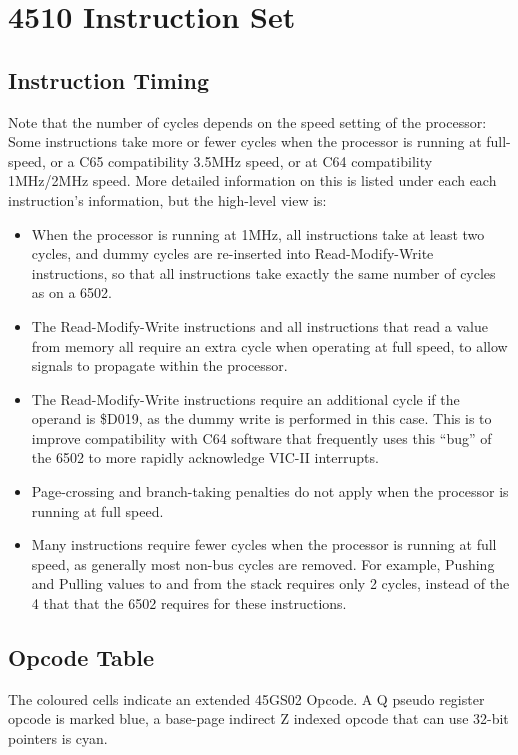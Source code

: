 \clearpage
\section{4510 Instruction Set}

\subsection{Instruction Timing}

Note that the number of cycles depends on the speed setting of the
processor: Some instructions take more or fewer cycles when the
processor is running at full-speed, or a C65 compatibility 3.5MHz speed,
or at C64 compatibility 1MHz/2MHz speed.  More detailed information on
this is listed under each each instruction's information, but the high-level
view is:

\begin{itemize}
\item When the processor is running at 1MHz, all instructions take at least
  two cycles, and dummy cycles are re-inserted into Read-Modify-Write instructions,
  so that all instructions take exactly the same number of cycles as on a 6502.
\item The Read-Modify-Write instructions and all instructions that read a value from
  memory all require an extra cycle when operating at full speed, to allow signals
  to propagate within the processor.
\item The Read-Modify-Write instructions require an additional cycle if the operand
  is \$D019, as the dummy write is performed in this case.
  This is to improve compatibility with C64 software that frequently uses this
  ``bug'' of the 6502 to more rapidly acknowledge VIC-II interrupts.
\item Page-crossing and branch-taking penalties do not apply when the processor is
  running at full speed.
\item Many instructions require fewer cycles when the processor is running at full
  speed, as generally most non-bus cycles are removed. For example, Pushing and Pulling
  values to and from the stack requires only 2 cycles, instead of the 4 that that the
  6502 requires for these instructions.
\end{itemize}

\subsection{Opcode Table}

The coloured cells indicate an extended 45GS02 Opcode. A Q pseudo register opcode is
marked blue, a base-page indirect Z indexed opcode that can use 32-bit pointers is cyan.

